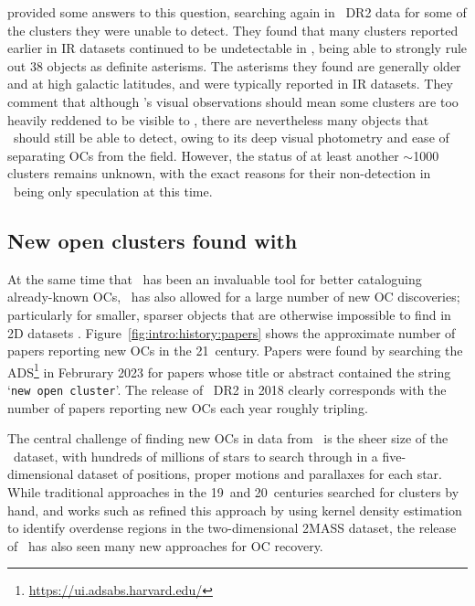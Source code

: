 \cite{cantat-gaudin_clusters_2020} provided some answers to this question, searching again in \gaia\ DR2 data for some of the clusters they were unable to detect. They found that many clusters reported earlier in IR datasets continued to be undetectable in \gaia, being able to strongly rule out 38 objects as definite asterisms. The asterisms they found are generally older and at high galactic latitudes, and were typically reported in IR datasets. They comment that although \gaia's visual observations should mean some clusters are too heavily reddened to be visible to \gaia, there are nevertheless many objects that \gaia\ should still be able to detect, owing to its deep visual photometry and ease of separating OCs from the field. However, the status of at least another $\sim$1000 clusters remains unknown, with the exact reasons for their non-detection in \gaia\ being only speculation at this time. 


\subsection{New open clusters found with \gaia}
\label{sec:intro:gaia:new_clusters}

At the same time that \gaia\ has been an invaluable tool for better cataloguing already-known OCs, \gaia\ has also allowed for a large number of new OC discoveries; particularly for smaller, sparser objects that are otherwise impossible to find in 2D datasets \citep{cantat-gaudin_milky_2022}. Figure~\ref{fig:intro:history:papers} shows the approximate number of papers reporting new OCs in the 21\first\ century. Papers were found by searching the ADS\footnote{\url{https://ui.adsabs.harvard.edu/}} in Februrary 2023 for papers whose title or abstract contained the string `\texttt{new open cluster}'. The release of \gaia\ DR2 in 2018 \citep{brown_gaia_2018} clearly corresponds with the number of papers reporting new OCs each year roughly tripling.

The central challenge of finding new OCs in data from \gaia\ is the sheer size of the \gaia\ dataset, with hundreds of millions of stars to search through in a five-dimensional dataset of positions, proper motions and parallaxes for each star. While traditional approaches in the 19\third\ and 20\third\ centuries searched for clusters by hand, and works such as \cite{froebrich_systematic_2007} refined this approach by using kernel density estimation to identify overdense regions in the two-dimensional 2MASS dataset, the release of \gaia\ has also seen many new approaches for OC recovery.

